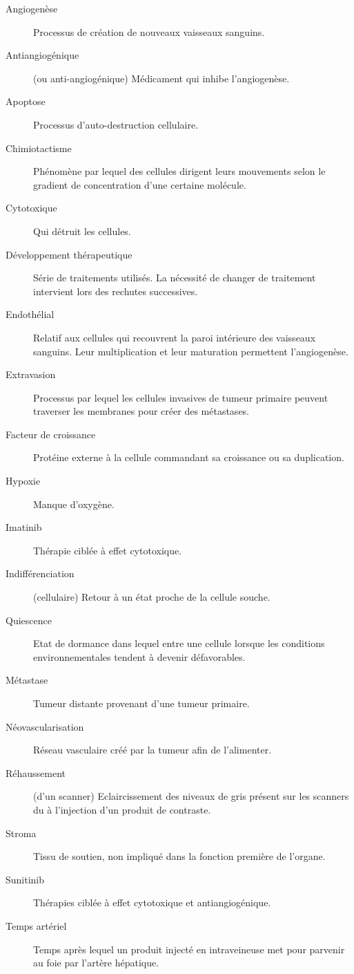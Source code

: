 \documentclass[main.tex]{subfiles}
\begin{document}

\begin{description}
\item[Angiogenèse] Processus de création de nouveaux vaisseaux sanguins. 
\item[Antiangiogénique] (ou anti-angiogénique) Médicament qui inhibe l'angiogenèse.
\item[Apoptose] Processus d'auto-destruction cellulaire.
\item[Chimiotactisme] Phénomène par lequel des cellules dirigent leurs mouvements selon le gradient de concentration d'une certaine molécule.
\item[Cytotoxique] Qui détruit les cellules.
\item[Développement thérapeutique] Série de traitements utilisés. La nécessité de changer de traitement intervient lors des rechutes successives. 
\item[Endothélial] Relatif aux cellules qui recouvrent la paroi intérieure des vaisseaux sanguins. Leur multiplication et leur maturation permettent l'angiogenèse.
\item[Extravasion] Processus par lequel les cellules invasives de tumeur primaire peuvent traverser les membranes pour créer des métastases. 
\item[Facteur de croissance] Protéine externe à la cellule commandant sa croissance ou sa duplication.
\item[Hypoxie] Manque d'oxygène.
\item[Imatinib] Thérapie ciblée à effet cytotoxique. 
\item[Indifférenciation] (cellulaire) Retour à un état proche de la cellule souche. 
\item[Quiescence] Etat de dormance dans lequel entre une cellule lorsque les conditions environnementales tendent à devenir défavorables.
\item[Métastase] Tumeur distante provenant d'une tumeur primaire.
\item[Néovascularisation] Réseau vasculaire créé par la tumeur afin de l'alimenter.
\item[Réhaussement] (d'un scanner) Eclaircissement des niveaux de gris présent sur les scanners du à l'injection d'un produit de contraste. 
\item[Stroma] Tissu de soutien, non impliqué dans la fonction première de l'organe.
\item[Sunitinib] Thérapies ciblée à effet cytotoxique et antiangiogénique. 
\item[Temps artériel] Temps après lequel un produit injecté en intraveineuse met pour parvenir au foie par l'artère hépatique.

\end{description}
\end{document}
